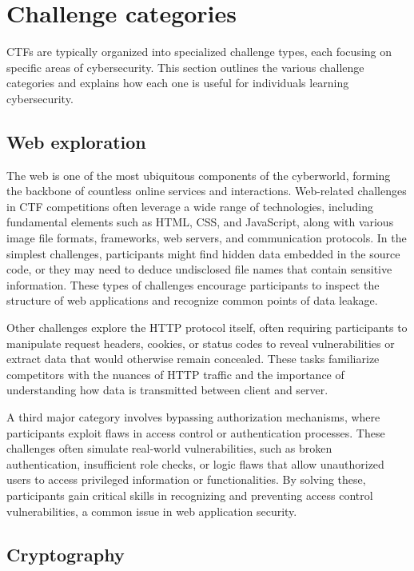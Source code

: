 \documentclass[conference]{IEEEtran}
\begin{document}
\section{Challenge categories}

CTFs are typically organized into specialized challenge types, each focusing on
specific areas of cybersecurity. This section outlines the various challenge
categories and explains how each one is useful for individuals learning
cybersecurity.

\subsection{Web exploration}

The web is one of the most ubiquitous components of the cyberworld, forming the
backbone of countless online services and interactions. Web-related challenges
in CTF competitions often leverage a wide range of technologies, including
fundamental elements such as HTML, CSS, and JavaScript, along with various
image file formats, frameworks, web servers, and communication protocols. In
the simplest challenges, participants might find hidden data embedded in the
source code, or they may need to deduce undisclosed file names that
contain sensitive information. These types of challenges encourage participants
to inspect the structure of web applications and recognize common points of
data leakage.

Other challenges explore the HTTP protocol itself, often requiring participants
to manipulate request headers, cookies, or status codes to reveal
vulnerabilities or extract data that would otherwise remain concealed. These
tasks familiarize competitors with the nuances of HTTP traffic and the
importance of understanding how data is transmitted between client and server.

A third major category involves bypassing authorization mechanisms, where
participants exploit flaws in access control or authentication processes. These
challenges often simulate real-world vulnerabilities, such as broken
authentication, insufficient role checks, or logic flaws that allow
unauthorized users to access privileged information or functionalities. By
solving these, participants gain critical skills in recognizing and preventing
access control vulnerabilities, a common issue in web application security.

\subsection{Cryptography}
\end{document}
